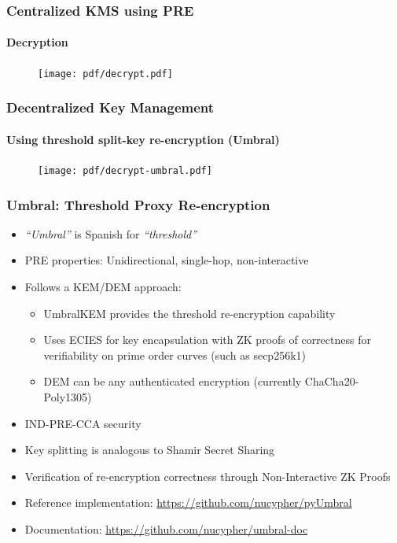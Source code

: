 \documentclass[xetex,mathsans,sans,aspectratio=169]{beamer}
\begin{document}
    \begin{frame}
        \frametitle{Centralized KMS using PRE}
        \framesubtitle{Decryption}
        \begin{figure}
            \centering
            \texttt{[image: pdf/decrypt.pdf]}
        \end{figure}
    \end{frame}

    \begin{frame}
        \frametitle{Decentralized Key Management}
        \framesubtitle{Using threshold split-key re-encryption (Umbral)}
        \begin{figure}
            \centering
            \texttt{[image: pdf/decrypt-umbral.pdf]}
        \end{figure}
    \end{frame}

    \begin{frame}
        \frametitle{Umbral: Threshold Proxy Re-encryption}
        \begin{itemize}
        	\item \emph{``Umbral''} is Spanish for \emph{``threshold''}
            \item PRE properties: Unidirectional, single-hop, non-interactive
            \item Follows a KEM/DEM approach:
            	\begin{itemize}
		    \item UmbralKEM provides the threshold re-encryption capability
                    \item Uses ECIES for key encapsulation with ZK proofs of correctness for verifiability on prime order curves (such as secp256k1)
            	    \item DEM can be any authenticated encryption (currently ChaCha20-Poly1305)
        	\end{itemize}
	    \item IND-PRE-CCA security
            \item Key splitting is analogous to Shamir Secret Sharing
	    \item Verification of re-encryption correctness through Non-Interactive ZK Proofs
            \item Reference implementation: \url{https://github.com/nucypher/pyUmbral}
	    \item Documentation: \url{https://github.com/nucypher/umbral-doc}
        \end{itemize}
    \end{frame}
\end{document}
